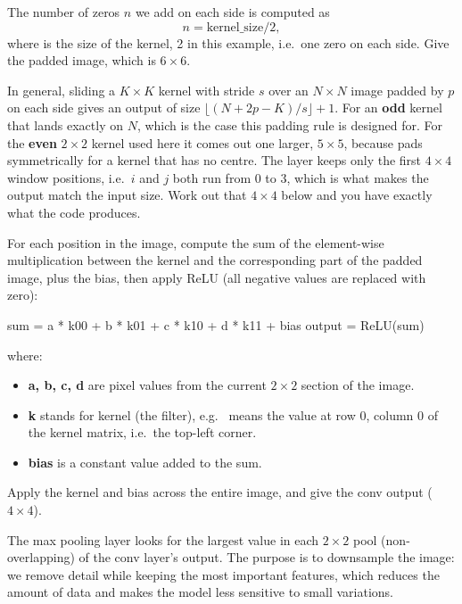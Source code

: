 The number of zeros $n$ we add on each side is computed as
\[
  n = \text{kernel\_size} / 2,
\]
where  is the size of the kernel, 2 in this example, i.e.\ one zero on each side.
Give the padded image, which is $6 \times 6$.

In general, sliding a $K \times K$ kernel with stride $s$ over an $N \times N$ image padded by $p$
on each side gives an output of size $\lfloor (N + 2p - K)/s \rfloor + 1$. For an \textbf{odd}
kernel that lands exactly on $N$, which is the case this padding rule is designed for. For the
\textbf{even} $2 \times 2$ kernel used here it comes out one larger, $5 \times 5$, because
 pads symmetrically for a kernel that has no centre. The layer keeps only
the first $4 \times 4$ window positions, i.e.\ $i$ and $j$ both run from 0 to 3, which is what makes
the output match the input size. Work out that $4 \times 4$ below and you have exactly what the code
produces.

For each position in the image, compute the sum of the element-wise multiplication between the
kernel and the corresponding part of the padded image, plus the bias, then apply ReLU (all negative
values are replaced with zero):

\begin{console}
sum = a * k00 + b * k01 + c * k10 + d * k11 + bias
output = ReLU(sum)
\end{console}

\noindent where:
\begin{itemize}
  \item \textbf{a, b, c, d} are pixel values from the current $2 \times 2$ section of the image.
  \item \textbf{k} stands for kernel (the filter), e.g.\  means the value at row 0,
    column 0 of the kernel matrix, i.e.\ the top-left corner.
  \item \textbf{bias} is a constant value added to the sum.
\end{itemize}
Apply the kernel and bias across the entire image, and give the conv output ($4 \times 4$).

The max pooling layer looks for the largest value in each $2 \times 2$ pool (non-overlapping) of the
conv layer's output. The purpose is to downsample the image: we remove detail while keeping the most
important features, which reduces the amount of data and makes the model less sensitive to small
variations.

